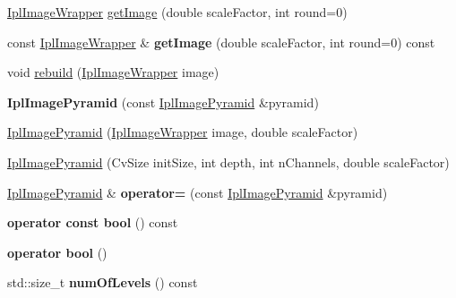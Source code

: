 \begin{DoxyCompactItemize}
\item 
\hyperlink{class_ipl_image_wrapper}{IplImageWrapper} \hyperlink{class_ipl_image_pyramid_a73af0a82dfdca6eaa25a75b3c73996a3}{getImage} (double scaleFactor, int round=0)
\item 
\hypertarget{class_ipl_image_pyramid_a19b6dff368a5342ff4f61bb431ea72ff}{
const \hyperlink{class_ipl_image_wrapper}{IplImageWrapper} \& {\bfseries getImage} (double scaleFactor, int round=0) const }
\label{class_ipl_image_pyramid_a19b6dff368a5342ff4f61bb431ea72ff}

\item 
void \hyperlink{class_ipl_image_pyramid_a24f697b2da922a8240aa9f24af476d5e}{rebuild} (\hyperlink{class_ipl_image_wrapper}{IplImageWrapper} image)
\item 
\hypertarget{class_ipl_image_pyramid_a14dd8c56c07c98f7714dcb5e76aaeb72}{
{\bfseries IplImagePyramid} (const \hyperlink{class_ipl_image_pyramid}{IplImagePyramid} \&pyramid)}
\label{class_ipl_image_pyramid_a14dd8c56c07c98f7714dcb5e76aaeb72}

\item 
\hyperlink{class_ipl_image_pyramid_a6d41d348cdfaea6e4444b1fdd523f555}{IplImagePyramid} (\hyperlink{class_ipl_image_wrapper}{IplImageWrapper} image, double scaleFactor)
\item 
\hyperlink{class_ipl_image_pyramid_a817d4a60ac96b844a97df0fa1bc52a5e}{IplImagePyramid} (CvSize initSize, int depth, int nChannels, double scaleFactor)
\item 
\hypertarget{class_ipl_image_pyramid_a526cc2971a83597e995e2e173de0e8dc}{
\hyperlink{class_ipl_image_pyramid}{IplImagePyramid} \& {\bfseries operator=} (const \hyperlink{class_ipl_image_pyramid}{IplImagePyramid} \&pyramid)}
\label{class_ipl_image_pyramid_a526cc2971a83597e995e2e173de0e8dc}

\item 
\hypertarget{class_ipl_image_pyramid_a3208ef615be469259755968496df11ea}{
{\bfseries operator const bool} () const }
\label{class_ipl_image_pyramid_a3208ef615be469259755968496df11ea}

\item 
\hypertarget{class_ipl_image_pyramid_a9759305c20611d150f35fed4df4b804e}{
{\bfseries operator bool} ()}
\label{class_ipl_image_pyramid_a9759305c20611d150f35fed4df4b804e}

\item 
\hypertarget{class_ipl_image_pyramid_aed09f40471c9cf123c9d5dfe7f0d6bd1}{
std::size\_\-t {\bfseries numOfLevels} () const }
\label{class_ipl_image_pyramid_aed09f40471c9cf123c9d5dfe7f0d6bd1}


\end{DoxyCompactItemize}

